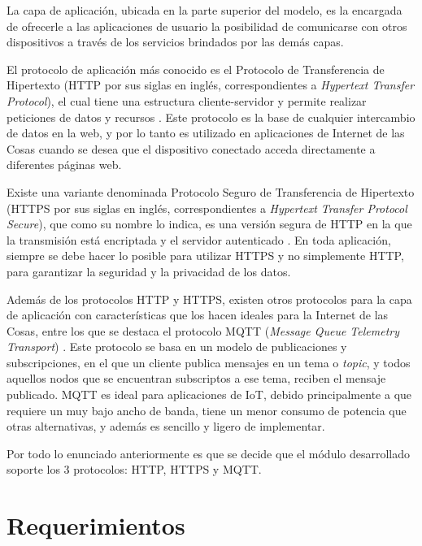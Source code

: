 La capa de aplicación, ubicada en la parte superior del modelo, es la encargada de ofrecerle a las aplicaciones de usuario la posibilidad de comunicarse con otros dispositivos a través de los servicios brindados por las demás capas.

El protocolo de aplicación más conocido es el Protocolo de Transferencia de Hipertexto (HTTP por sus siglas en inglés, correspondientes a \emph{Hypertext Transfer Protocol}), el cual tiene una estructura cliente-servidor y permite realizar peticiones de datos y recursos \citep{http_protocol}. Este protocolo es la base de cualquier intercambio de datos en la web, y por lo tanto es utilizado en aplicaciones de Internet de las Cosas cuando se desea que el dispositivo conectado acceda directamente a diferentes páginas web.

Existe una variante denominada Protocolo Seguro de Transferencia de Hipertexto (HTTPS por sus siglas en inglés, correspondientes a \emph{Hypertext Transfer Protocol Secure}), que como su nombre lo indica, es una versión segura de HTTP en la que la transmisión está encriptada y el servidor autenticado \citep{https_protocol}. En toda aplicación, siempre se debe hacer lo posible para utilizar HTTPS y no simplemente HTTP, para garantizar la seguridad y la privacidad de los datos.

Además de los protocolos HTTP y HTTPS, existen otros protocolos para la capa de aplicación con características que los hacen ideales para la Internet de las Cosas, entre los que se destaca el protocolo MQTT (\emph{Message Queue Telemetry Transport}) \citep{mqtt_protocol}. Este protocolo se basa en un modelo de publicaciones y subscripciones, en el que un cliente publica mensajes en un tema o \emph{topic}, y todos aquellos nodos que se encuentran subscriptos a ese tema, reciben el mensaje publicado. MQTT es ideal para aplicaciones de IoT, debido principalmente a que requiere un muy bajo ancho de banda, tiene un menor consumo de potencia que otras alternativas, y además es sencillo y ligero de implementar.

Por todo lo enunciado anteriormente es que se decide que el módulo desarrollado soporte los 3 protocolos: HTTP, HTTPS y MQTT.

\section{Requerimientos}

